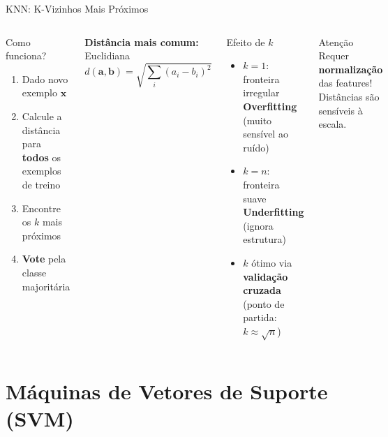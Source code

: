 \documentclass[aspectratio=169]{beamer}
\begin{document}
\begin{frame}{KNN: K-Vizinhos Mais Próximos}
\begin{columns}[T]
\begin{block}{Como funciona?}
\begin{enumerate}
  \item Dado novo exemplo $\mathbf{x}$
  \item Calcule a distância para \textbf{todos} os exemplos de treino
  \item Encontre os $k$ mais próximos
  \item \textbf{Vote} pela classe majoritária
\end{enumerate}
\end{block}
\vspace{0.3em}
\textbf{Distância mais comum:} Euclidiana
\[d(\mathbf{a},\mathbf{b}) = \sqrt{\sum_i (a_i - b_i)^2}\]

\begin{alertblock}{Efeito de $k$}
\begin{itemize}
  \item $k=1$: fronteira irregular \newline \textbf{Overfitting} (muito sensível ao ruído)
  \vspace{0.3em}
  \item $k=n$: fronteira suave \newline \textbf{Underfitting} (ignora estrutura)
  \vspace{0.3em}
  \item $k$ ótimo via \textbf{validação cruzada} \newline (ponto de partida: $k \approx \sqrt{n}$)
\end{itemize}
\end{alertblock}
\begin{exampleblock}{Atenção}
  Requer \textbf{normalização} das features! Distâncias são sensíveis à escala.
\end{exampleblock}
\end{columns}
\end{frame}

\section{Máquinas de Vetores de Suporte (SVM)}
\end{document}
